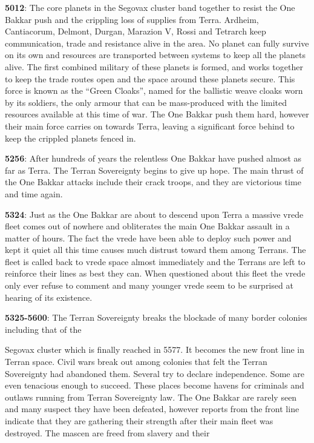 \textbf{5012}: The core planets in the Segovax cluster band together to resist the One Bakkar push and the crippling loss of supplies from Terra. Ardheim, Cantiacorum, Delmont, Durgan, Marazion V, Rossi and Tetrarch keep communication, trade and resistance alive in the area. No planet can fully survive on its own and resources are transported between systems to keep all the planets alive. The first combined military of these planets is formed, and works together to keep the trade routes open and the space around these planets secure. This force is known as the ``Green Cloaks'', named for the ballistic weave cloaks worn by its soldiers, the only armour that can be mass-produced with the limited resources available at this time of war. The One Bakkar push them hard, however their main force carries on towards Terra, leaving a significant force behind to keep the crippled planets fenced in.

\textbf{5256}: After hundreds of years the relentless One Bakkar have pushed almost as far as Terra. The Terran Sovereignty begins to give up hope. The main thrust of the One Bakkar attacks include their crack troops, and they are victorious time and time again.

\textbf{5324}: Just as the One Bakkar are about to descend upon Terra a massive vrede fleet comes out of nowhere and obliterates the main One Bakkar assault in a matter of hours. The fact the vrede have been able to deploy such power and kept it quiet all this time causes much distrust toward them among Terrans. The fleet is called back to vrede space almost immediately and the Terrans are left to reinforce their lines as best they can. When questioned about this fleet the vrede only ever refuse to comment and many younger vrede seem to be surprised at hearing of its existence.

\textbf{5325-5600}: The Terran Sovereignty breaks the blockade of many border colonies including that of the

Segovax cluster which is finally reached in 5577. It becomes the new front line in Terran space. Civil wars break out among colonies that felt the Terran Sovereignty had abandoned them. Several try to declare independence. Some are even tenacious enough to succeed. These places become havens for criminals and outlaws running from Terran Sovereignty law. The One Bakkar are rarely seen and many suspect they have been defeated, however reports from the front line indicate that they are gathering their strength after their main fleet was destroyed. The mascen are freed from slavery and their

